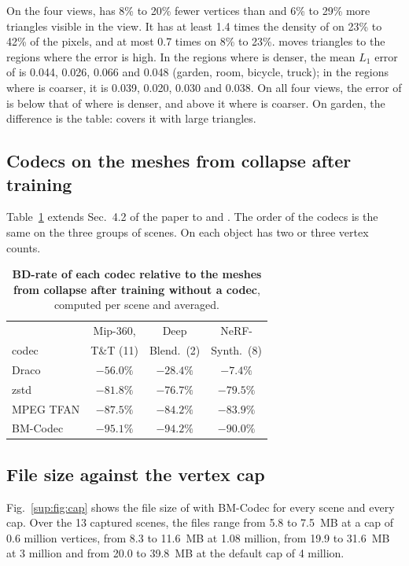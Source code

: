 On the four views, \BM has 8\% to 20\% fewer vertices than \MSc and 6\% to 29\% more triangles visible in the view. It has at least 1.4 times the density of \MSc on 23\% to 42\% of the pixels, and at most 0.7 times on 8\% to 23\%. \BM moves triangles to the regions where the error is high. In the regions where \BM is denser, the mean $L_1$ error of \MSc is 0.044, 0.026, 0.066 and 0.048 (garden, room, bicycle, truck); in the regions where \BM is coarser, it is 0.039, 0.020, 0.030 and 0.038. On all four views, the error of \BM is below that of \MSc where \BM is denser, and above it where \BM is coarser. On garden, the difference is the table: \MSc covers it with large triangles.


\subsection{Codecs on the meshes from collapse after training}
Table~\ref{sup:tab:collapse-bd} extends Sec.~4.2 of the paper to \DeepBlending and \NeRFSyn. The order of the codecs is the same on the three groups of scenes. On \NeRFSyn each object has two or three vertex counts.

\begin{table}[!htb]\centering\footnotesize
\caption{\textbf{BD-rate of each codec relative to the meshes from collapse after training without a codec}, computed per scene and averaged.}
\label{sup:tab:collapse-bd}
\begin{tabular}{@{}lccc@{}}
\toprule
 & Mip-360, & Deep & NeRF- \\
codec & T\&T (11) & Blend.\ (2) & Synth.\ (8) \\
\midrule
Draco & $-56.0\%$ & $-28.4\%$ & $-7.4\%$ \\
zstd & $-81.8\%$ & $-76.7\%$ & $-79.5\%$ \\
MPEG TFAN & $-87.5\%$ & $-84.2\%$ & $-83.9\%$ \\
BM-Codec & $-95.1\%$ & $-94.2\%$ & $-90.0\%$ \\
\bottomrule
\end{tabular}
\end{table}

\subsection{File size against the vertex cap}
Fig.~\ref{sup:fig:cap} shows the file size of \MSc with BM-Codec for every scene and every cap. Over the 13 captured scenes, the files range from 5.8 to 7.5~MB at a cap of 0.6 million vertices, from 8.3 to 11.6~MB at 1.08 million, from 19.9 to 31.6~MB at 3 million and from 20.0 to 39.8~MB at the default cap of 4 million.

